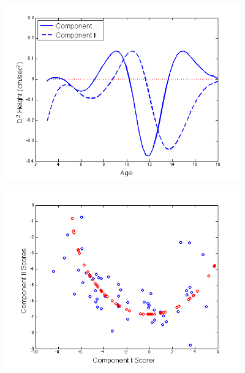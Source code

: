 \documentclass[11pt]{beamer}
\begin{document}

\begin{frame}

\begin{center}
\includegraphics[width=4in]{figs/GrowthComponent_0.png}
\end{center}

\end{frame}


\begin{frame}

\begin{center}
\includegraphics[width=4in]{figs/GrowthScore_0.png}
\end{center}

\end{frame}

\end{document}
